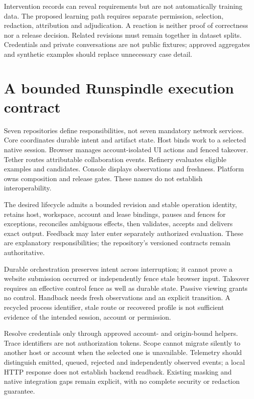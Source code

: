 \documentclass[11pt,letterpaper]{article}
\begin{document}
Intervention records can reveal requirements but are not automatically training
data. The proposed learning path requires separate permission, selection,
redaction, attribution and adjudication. A reaction is neither proof of
correctness nor a release decision. Related revisions must remain together in
dataset splits. Credentials and private conversations are not public fixtures;
approved aggregates and synthetic examples should replace unnecessary case detail.

\section{A bounded Runspindle execution contract}
\label{sec:harness}
Seven repositories define responsibilities, not seven mandatory network services.
Core coordinates durable intent and artifact state. Host binds work to a selected
native session. Browser manages account-isolated UI actions and fenced takeover.
Tether routes attributable collaboration events. Refinery evaluates eligible
examples and candidates. Console displays observations and freshness. Platform
owns composition and release gates. These names do not establish interoperability.

The desired lifecycle admits a bounded revision and stable operation identity,
retains host, workspace, account and lease bindings, pauses and fences for exceptions,
reconciles ambiguous effects, then validates, accepts and delivers exact output.
Feedback may later enter separately authorized evaluation. These are explanatory
responsibilities; the repository's versioned contracts remain authoritative.



Durable orchestration preserves intent across interruption; it cannot prove a
website submission occurred or independently fence stale browser input. Takeover
requires an effective control fence as well as durable state. Passive viewing
grants no control. Handback needs fresh observations and an explicit transition.
A recycled process identifier, stale route or recovered profile is not sufficient
evidence of the intended session, account or permission.

Resolve credentials only through approved account- and origin-bound helpers.
Trace identifiers are not authorization tokens. Scope cannot migrate silently to
another host or account when the selected one is unavailable. Telemetry should
distinguish emitted, queued, rejected and independently observed events; a local
HTTP response does not establish backend readback. Existing masking and native
integration gaps remain explicit, with no complete security or redaction guarantee.
\end{document}
